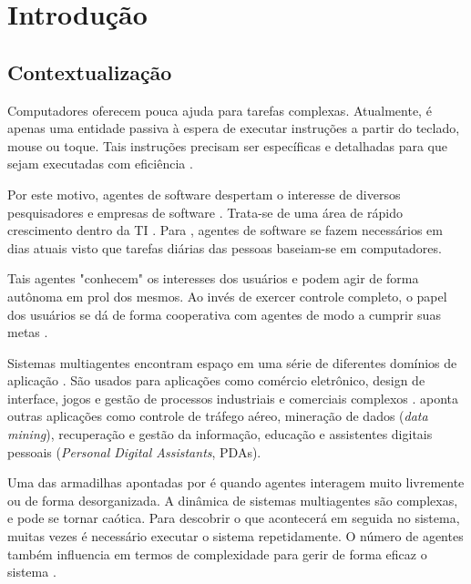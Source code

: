 \chapter[Introdução]{Introdução}\label{ch:introducao}

\section{Contextualização}

Computadores oferecem pouca ajuda para tarefas complexas. Atualmente, é apenas uma entidade passiva à espera de executar instruções a partir do teclado, mouse ou toque. Tais instruções precisam ser específicas e detalhadas para que sejam executadas com eficiência \cite{green1997}.

Por este motivo, agentes de software despertam o interesse de diversos pesquisadores e empresas de software \cite{green1997}. Trata-se de uma área de rápido crescimento dentro da TI \cite{jennings1996}. Para , agentes de software se fazem necessários em dias atuais visto que tarefas diárias das pessoas baseiam-se em computadores. 

Tais agentes "conhecem" os interesses dos usuários e podem agir de forma autônoma em prol dos mesmos. Ao invés de exercer controle completo, o papel dos usuários se dá de forma cooperativa com agentes de modo a cumprir suas metas \cite{green1997}.


Sistemas multiagentes encontram espaço em uma série de diferentes domínios de aplicação \cite[pág. 246]{livrao}. São usados para aplicações como comércio eletrônico, design de interface, jogos e gestão de processos industriais e comerciais complexos \cite{jennings1996}.  aponta outras aplicações como controle de tráfego aéreo, mineração de dados (\textit{data mining}), recuperação e gestão da informação, educação e assistentes digitais pessoais (\textit{Personal Digital Assistants}, PDAs).



Uma das armadilhas apontadas por  é quando agentes interagem muito livremente ou de forma desorganizada. A dinâmica de sistemas multiagentes são complexas, e pode se tornar caótica. Para descobrir o que acontecerá em seguida no sistema, muitas vezes é necessário executar o sistema repetidamente. O número de agentes também influencia em termos de complexidade para gerir de forma eficaz o sistema \cite[pág. 246]{livrao}. 

